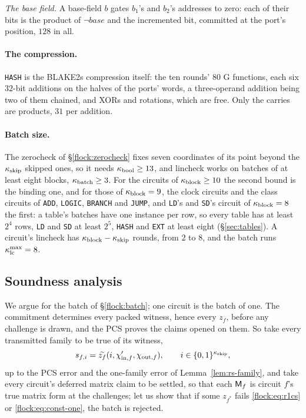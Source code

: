 \emph{The base field.} A base-field $b$ gates $b_1$'s and $b_2$'s addresses to zero: each of their bits is the product of $\neg\mathit{base}$ and the incremented bit, committed at the port's position, $128$ in all.

\paragraph{The compression.} \texttt{HASH} is the BLAKE2s compression itself: the ten rounds' $80$ G functions, each six $32$-bit additions on the halves of the ports' words, a three-operand addition being two of them chained, and XORs and rotations, which are free. Only the carries are products, $31$ per addition.

\paragraph{Batch size.} The zerocheck of \S\ref{flock:zerocheck} fixes seven coordinates of its point beyond the $\kappa_{\mathrm{skip}}$ skipped ones, so it needs $\kappa_{\mathrm{bool}}\ge13$, and lincheck works on batches of at least eight blocks, $\kappa_{\mathrm{batch}}\ge3$. For the circuits of $\kappa_{\mathrm{block}}\ge10$ the second bound is the binding one, and for those of $\kappa_{\mathrm{block}}=9$, the clock circuits and the class circuits of \texttt{ADD}, \texttt{LOGIC}, \texttt{BRANCH} and \texttt{JUMP}, and \texttt{LD}'s and \texttt{SD}'s circuit of $\kappa_{\mathrm{block}}=8$ the first: a table's batches have one instance per row, so every table has at least $2^{4}$ rows, \texttt{LD} and \texttt{SD} at least $2^{5}$, \texttt{HASH} and \texttt{EXT} at least eight (\S\ref{sec:tables}). A circuit's lincheck has $\kappa_{\mathrm{block}}-\kappa_{\mathrm{skip}}$ rounds, from $2$ to $8$, and the batch runs $\kappa_{\mathrm{lc}}^{\max}=8$.

\subsection{Soundness analysis}\label{flock:soundness}

We argue for the batch of \S\ref{flock:batch}; one circuit is the batch of one. The commitment determines every packed witness, hence every $z_f$, before any challenge is drawn, and the PCS proves the claims opened on them. So take every transmitted family to be true of its witness,
\[
s_{f,i}=\widetilde{z_f}(i,\chi'_{\mathrm{in},f},\chi_{\mathrm{out},f}),\qquad i\in\{0,1\}^{\kappa_{\mathrm{skip}}},
\]
up to the PCS error and the one-family error of Lemma~\ref{lem:rs-family}, and take every circuit's deferred matrix claim to be settled, so that each $\mathsf{M}_{f}$ is circuit $f$'s true matrix form at the challenges; let us show that if some $z_{f^\ast}$ fails \eqref{flock:eq:r1cs} or \eqref{flock:eq:const-one}, the batch is rejected.


